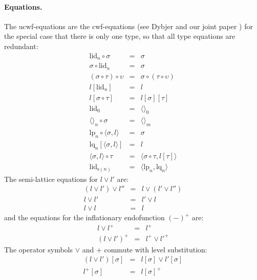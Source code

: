 \documentclass[submission,copyright,creativecommons]{eptcs}
\newcommand{\id}{\mathsf{id}}
\def\sub{\mathrm{hom}}
\def\id{\mathrm{id}}
\def\lctx{\mathrm{lctx}}
\def\lp{\mathrm{lp}}
\def\lq{\mathrm{lq}}
\def\s{\mathrm{s}}
\def\lid{\mathrm{lid}}
\newcommand{\ctx}{\mathrm{ctx}}
\newcommand{\ty}{\mathrm{ty}}
\newcommand{\tm}{\mathrm{tm}}
\newcommand{\tuple}[1]{\langle #1 \rangle}
\begin{document}
\paragraph{Equations.}
The ucwf-equations are the cwf-equations (see Dybjer \cite{dybjer:torino} and our joint paper \cite{BezemCDE22})
for the special case that there is only one type, so that all type equations are redundant:
\begin{eqnarray*}
\lid_{n} \circ \sigma &=& \sigma \\
 \sigma \circ \lid_{n} &=& \sigma \\
(\sigma \circ \tau) \circ \upsilon &=& \sigma \circ (\tau \circ \upsilon)\\
l[\lid_{n}] &=& l \\
l[\sigma\circ\tau] &=& l[\sigma][\tau]\\
\lid_{0} &=& \tuple{}_{0}\\
\tuple{}_{n}\circ\sigma &=& \tuple{}_{m}\\
\lp_n \circ \tuple{\sigma,l} &=& \sigma\\
\lq_n [\tuple{\sigma,l}] &=& l\\
\tuple{\sigma,l} \circ \tau &=& \tuple{\sigma \circ \tau,l[\tau]}\\
\lid_{\s(n)} &=& \tuple{\lp_n,\lq_n}
\end{eqnarray*}
The semi-lattice equations for $l \vee l'$ are:
\begin{eqnarray*}
(l \vee l') \vee l'' &=& l \vee (l' \vee l'')\\
l \vee l' &=& l'\vee l\\
l \vee l &=& l
\end{eqnarray*}
and the equations for the inflationary endofunction $(-)^+$ are:
\begin{eqnarray*}
l \vee l^+ &=& l^+\\
(l\vee l')^+ &=& l^+\vee l'^+
\end{eqnarray*}
The operator symbols $\vee$ and $+$ commute with level substitution:
\begin{eqnarray*}
(l \vee l')[\sigma] &=& l[\sigma] \vee l' [\sigma]\\
 l^+[\sigma] &=&  l[\sigma]^+
\end{eqnarray*}
\end{document}
